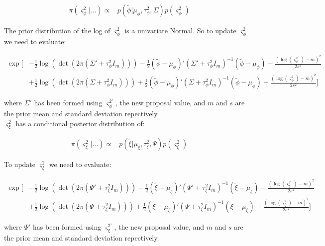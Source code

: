 \documentclass{article}
\begin{document}
\begin{align*}
\pi(\varsigma^2_\phi | \dots ) \propto & p(\tilde{\phi} | \mu_\phi, \tau^2_\phi, \Sigma) p(\varsigma^2_\phi)
\end{align*}

The prior distribution of the log of $\varsigma^2_\phi$ is a univariate Normal. So to update $\varsigma^2_\phi$ we need to evaluate:

\begin{align}
\exp \Bigg[ & - \frac{1}{2}  \log(\det(2 \pi (\Sigma' + \tau^2_\phi I_m))) -\frac{1}{2}  (\tilde{\phi} - \mu_\phi)' (\Sigma' + \tau^2_\phi I_m)^{-1} (\tilde{\phi} - \mu_\phi) - \frac{(\log(\varsigma^{2'}_\phi) - m)^2}{2 s^2} \nonumber \\
& + \frac{1}{2}  \log(\det(2 \pi (\Sigma + \tau^2_\phi I_m))) + \frac{1}{2} (\tilde{\phi} - \mu_\phi)' (\Sigma + \tau^2_\phi I_m)^{-1} (\tilde{\phi} - \mu_\phi) + \frac{(\log(\varsigma^2_\phi) - m)^2}{2 s^2} \Bigg] \label{eq:2vs1}
\end{align}

where $\Sigma'$ has been formed using $\varsigma^{2'}_\phi$, the new proposal value, and $m$ and $s$ are the prior mean and standard deviation repectively. \\

$\varsigma^2_\xi$ has a conditional posterior distribution of:

\begin{align*}
\pi(\varsigma^2_\xi | \dots ) \propto & p(\tilde{\xi} | \mu_\xi, \tau^2_\xi, \Psi) p(\varsigma^2_\xi)
\end{align*}

To update $\varsigma^2_\xi$ we need to evaluate:

\begin{align}
\exp \Bigg[ & -\frac{1}{2} \log(\det(2 \pi (\Psi' + \tau^2_\xi I_m))) -\frac{1}{2}  (\tilde{\xi} - \mu_\xi)' (\Psi' + \tau^2_\xi I_m)^{-1} (\tilde{\xi} - \mu_\xi) - \frac{(\log(\varsigma^{2'}_\xi) - m)^2}{2 s^2} \nonumber \\
& +  \frac{1}{2} \log(\det(2 \pi (\Psi + \tau^2_\xi I_m))) + \frac{1}{2} (\tilde{\xi} - \mu_\xi)' (\Psi + \tau^2_\xi I_m)^{-1} (\tilde{\xi} - \mu_\xi) + \frac{(\log(\varsigma^2_\xi) - m)^2}{2 s^2} \Bigg] \label{eq:2vs2}
\end{align}

where $\Psi'$ has been formed using $\varsigma^{2'}_\xi$, the new proposal value, and $m$ and $s$ are the prior mean and standard deviation repectively. \\
\end{document}
